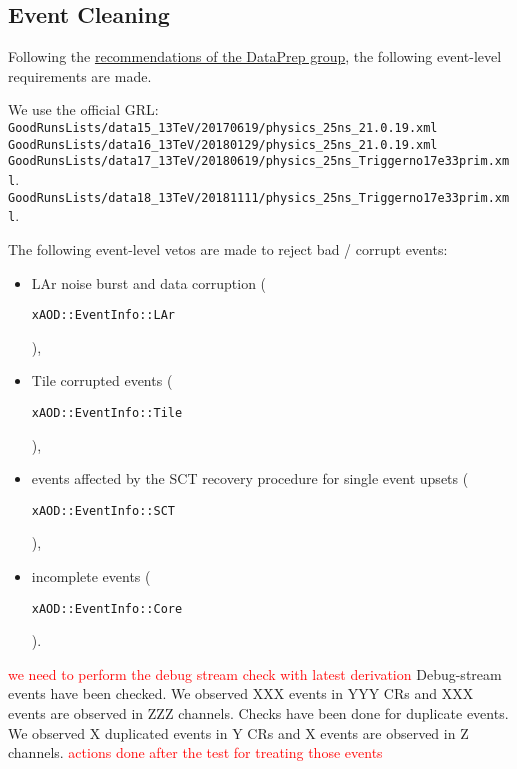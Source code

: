 \subsection{Event Cleaning}
\label{subsec:event_cleaning}


Following the \href{https://twiki.cern.ch/twiki/bin/viewauth/Atlas/DataPreparationCheckListForPhysicsAnalysis}{recommendations of the DataPrep group}, the following event-level requirements are made.

We use the official GRL: \\
{\footnotesize
\texttt{GoodRunsLists/data15\_13TeV/20170619/physics\_25ns\_21.0.19.xml} \\
\texttt{GoodRunsLists/data16\_13TeV/20180129/physics\_25ns\_21.0.19.xml} \\
\texttt{GoodRunsLists/data17\_13TeV/20180619/physics\_25ns\_Triggerno17e33prim.xml}. \\
\texttt{GoodRunsLists/data18\_13TeV/20181111/physics\_25ns\_Triggerno17e33prim.xml}. \\
}

The following event-level vetos are made to reject bad / corrupt events:
 \begin{itemize}
  \item LAr noise burst and data corruption (\begin{verbatim}xAOD::EventInfo::LAr\end{verbatim}),
  \item Tile corrupted events (\begin{verbatim}xAOD::EventInfo::Tile\end{verbatim}),
  \item events affected by the SCT recovery procedure for single event upsets (\begin{verbatim}xAOD::EventInfo::SCT\end{verbatim}),
  \item incomplete events (\begin{verbatim}xAOD::EventInfo::Core\end{verbatim}).
 \end{itemize}
 
\textcolor{red}{we need to perform the debug stream check with latest derivation}
 Debug-stream events have  been checked. We observed XXX events in YYY CRs and XXX events are observed in ZZZ channels.
 Checks have been done for duplicate events. We observed X duplicated events in Y CRs and X events are observed in Z channels.
\textcolor{red}{actions done after the test for treating those events}

